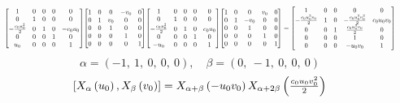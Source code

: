 \documentclass[11pt]{article}
\theoremstyle{definition}
\begin{document}
\[
\scaletoalign{\textwidth}{{\left[\begin{matrix}1 & 0 & 0 & 0 & 0\\0 & 1 & 0 & 0 & 0\\- \frac{c_{0} u_{0}^{2}}{2} & 0 & 1 & 0 & - c_{0} u_{0}\\0 & 0 & 0 & 1 & 0\\u_{0} & 0 & 0 & 0 & 1\end{matrix}\right]} {\left[\begin{matrix}1 & 0 & 0 & - v_{0} & 0\\0 & 1 & v_{0} & 0 & 0\\0 & 0 & 1 & 0 & 0\\0 & 0 & 0 & 1 & 0\\0 & 0 & 0 & 0 & 1\end{matrix}\right]} {\left[\begin{matrix}1 & 0 & 0 & 0 & 0\\0 & 1 & 0 & 0 & 0\\- \frac{c_{0} u_{0}^{2}}{2} & 0 & 1 & 0 & c_{0} u_{0}\\0 & 0 & 0 & 1 & 0\\- u_{0} & 0 & 0 & 0 & 1\end{matrix}\right]} {\left[\begin{matrix}1 & 0 & 0 & v_{0} & 0\\0 & 1 & - v_{0} & 0 & 0\\0 & 0 & 1 & 0 & 0\\0 & 0 & 0 & 1 & 0\\0 & 0 & 0 & 0 & 1\end{matrix}\right]} = {\left[\begin{matrix}1 & 0 & 0 & 0 & 0\\- \frac{c_{0} u_{0}^{2} v_{0}}{2} & 1 & 0 & - \frac{c_{0} u_{0}^{2} v_{0}^{2}}{2} & c_{0} u_{0} v_{0}\\0 & 0 & 1 & \frac{c_{0} u_{0}^{2} v_{0}}{2} & 0\\0 & 0 & 0 & 1 & 0\\0 & 0 & 0 & - u_{0} v_{0} & 1\end{matrix}\right]}}
\]
\[
\alpha = \left( -1, \  1, \  0, \  0, \  0\right), \quad \beta = \left( 0, \  -1, \  0, \  0, \  0\right)
\]
\[
\scaletoalign{\textwidth}{\left[ X_{\alpha}\left(u_{0}\right), X_{\beta}\left(v_{0}\right) \right] = X_{\alpha + \beta}\left(- u_{0} v_{0}\right) X_{\alpha + 2\beta}\left(\frac{c_{0} u_{0} v_{0}^{2}}{2}\right)}
\]
\end{document}
